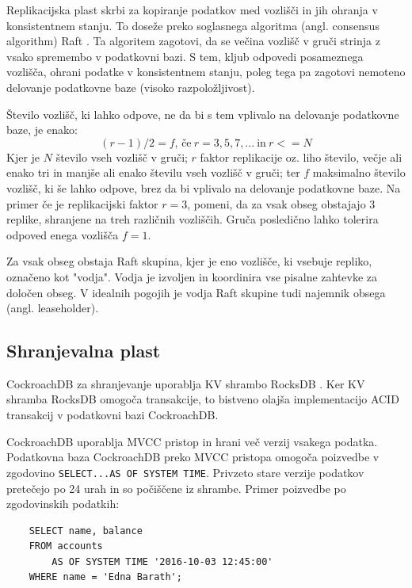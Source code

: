 \documentclass[a4paper, 12pt]{book}
\begin{document}
Replikacijska plast skrbi za kopiranje podatkov med vozlišči in jih ohranja v konsistentnem stanju. To doseže preko soglasnega algoritma (angl. consensus algorithm) Raft \cite{raft-vs-paxos}. Ta algoritem zagotovi, da se večina vozlišč v gruči strinja z vsako spremembo v podatkovni bazi. S tem, kljub odpovedi posameznega vozlišča, ohrani podatke v konsistentnem stanju, poleg tega pa zagotovi nemoteno delovanje podatkovne baze (visoko razpoložljivost).

Število vozlišč, ki lahko odpove, ne da bi s tem vplivalo na delovanje podatkovne baze, je enako:
\[(r - 1)/2 = f \text{, če}\ r = 3, 5, 7, ...\ \text{in}\ r <= N\]
Kjer je \(N\) število vseh vozlišč v gruči; \(r\) faktor replikacije oz. liho število, večje ali enako tri in manjše ali enako številu vseh vozlišč v gruči; ter \(f\) maksimalno število vozlišč, ki še lahko odpove, brez da bi vplivalo na delovanje podatkovne baze. Na primer če je replikacijski faktor \(r = 3\), pomeni, da za vsak obseg obstajajo 3 replike, shranjene na treh različnih vozliščih. Gruča posledično lahko tolerira odpoved enega vozlišča \(f = 1\).

Za vsak obseg obstaja Raft skupina, kjer je eno vozlišče, ki vsebuje repliko, označeno kot "vodja". Vodja je izvoljen in koordinira vse pisalne zahtevke za določen obseg. V idealnih pogojih je vodja Raft skupine tudi najemnik obsega (angl. leaseholder).

\subsection{Shranjevalna plast}

CockroachDB za shranjevanje uporablja KV shrambo RocksDB \cite{rocksdb-home}. Ker KV shramba RocksDB omogoča transakcije, to bistveno olajša implementacijo ACID transakcij v podatkovni bazi CockroachDB.

CockroachDB uporablja MVCC pristop in hrani več verzij vsakega podatka. Podatkovna baza CockroachDB preko MVCC pristopa omogoča poizvedbe v zgodovino \texttt{SELECT...AS OF SYSTEM TIME}. Privzeto stare verzije podatkov pretečejo po 24 urah in so počiščene iz shrambe. Primer poizvedbe po zgodovinskih podatkih:

\begin{listing}[H]
\begin{verbatim}
    SELECT name, balance
    FROM accounts
        AS OF SYSTEM TIME '2016-10-03 12:45:00'
    WHERE name = 'Edna Barath';
\end{verbatim}
\label{sql-example-as-of-system-time}
\end{listing}
\end{document}
